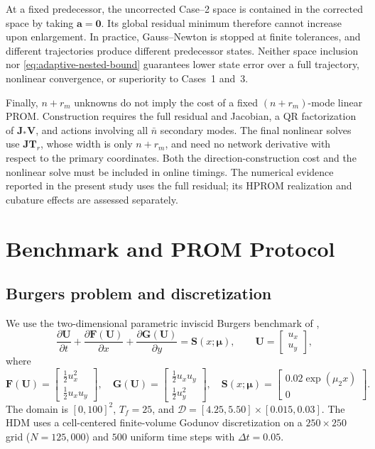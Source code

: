 \documentclass[11pt]{article}
\newcommand{\mub}{\bm\mu}
\begin{document}
At a fixed predecessor, the uncorrected Case--2 space is contained in the
corrected space by taking $\mathbf a=\mathbf0$.  Its global residual
minimum therefore cannot increase upon enlargement.  In practice,
Gauss--Newton is stopped at finite tolerances, and different trajectories
produce different predecessor states.  Neither space inclusion nor
\eqref{eq:adaptive-nested-bound} guarantees lower state error over a full
trajectory, nonlinear convergence, or superiority to Cases~1 and~3.

Finally, $n+r_m$ unknowns do not imply the cost of a fixed
$(n+r_m)$-mode linear PROM.  Construction requires the full residual and
Jacobian, a QR factorization of $\mathbf J_*\mathbf V$, and actions
involving all $\bar n$ secondary modes.  The final nonlinear solves use
$\mathbf J\mathbf T_r$, whose width is only $n+r_m$, and need no
network derivative with respect to the primary coordinates.  Both the
direction-construction cost and the nonlinear solve must be included in
online timings.  The numerical evidence reported in the present study uses
the full residual; its HPROM realization and cubature effects are assessed
separately.

\section{Benchmark and PROM Protocol}
\label{sec:benchmark}
\subsection{Burgers problem and discretization}
We use the two-dimensional parametric inviscid Burgers benchmark of
\cite{barnett2023neural},
\begin{equation}
\frac{\partial\mathbf U}{\partial t}+
\frac{\partial\mathbf F(\mathbf U)}{\partial x}+
\frac{\partial\mathbf G(\mathbf U)}{\partial y}=\mathbf S(x;\mub),\qquad
\mathbf U=\begin{bmatrix}u_x\\u_y\end{bmatrix},
\end{equation}
where
\begin{equation}
\mathbf F(\mathbf U)=\begin{bmatrix}\tfrac12u_x^2\\\tfrac12u_xu_y\end{bmatrix},
\quad\mathbf G(\mathbf U)=\begin{bmatrix}\tfrac12u_xu_y\\\tfrac12u_y^2\end{bmatrix},
\quad\mathbf S(x;\mub)=\begin{bmatrix}0.02\exp(\mu_2x)\\0\end{bmatrix}.
\end{equation}
The domain is $[0,100]^2$, $T_f=25$, and
$\mathcal D=[4.25,5.50]\times[0.015,0.03]$.  The HDM uses a cell-centered
finite-volume Godunov discretization on a $250\times250$ grid
($N=125{,}000$) and $500$ uniform time steps with $\Delta t=0.05$.
\end{document}

